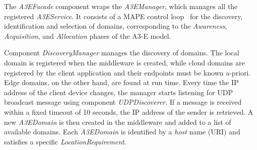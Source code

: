 
The \textit{A3EFacade} component wraps the \textit{A3EManager}, which manages all the registered \textit{A3EService}. It consists of a MAPE control loop~\cite{kephart2003vision} for the discovery, identification and selection of domains, corresponding to the \textit{Awareness}, \textit{Acquisition}, and \textit{Allocation} phases of the A3-E model. 


Component \textit{DiscoveryManager} manages the discovery of domains. The local domain is registered when the middleware is created, while cloud domains are registered by the client application and their endpoints must be known a-priori. Edge domains, on the other hand, are found at run time. Every time the IP address of the client device changes, the manager starts listening for UDP broadcast message using component \textit{UDPDiscoverer}. If a message is received within a fixed timeout of 10 seconds, the IP address of the sender is retrieved. A new \textit{A3EDomain} is then created in the middleware and added to a list of available domains. Each \textit{A3EDomain} is identified by a \textit{host} name (URI) and satisfies a specific \textit{LocationRequirement}. 



